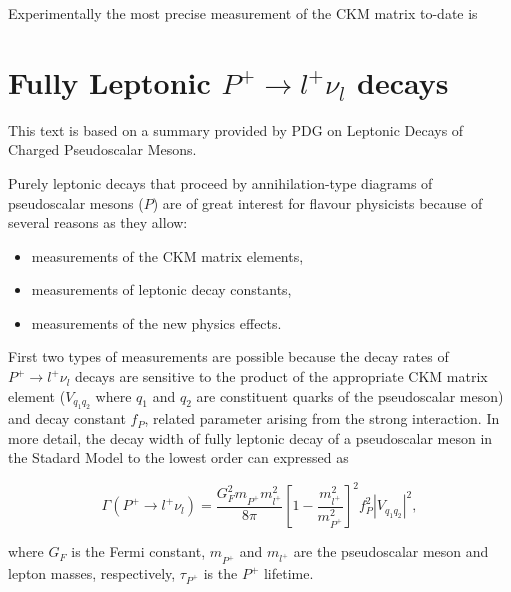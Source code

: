 Experimentally the most precise measurement of the CKM matrix\cite{ewconstraint} to-date is 

\section{Fully Leptonic $P^{+}\rightarrow l^{+} \nu_{l}$ decays}
This text is based on a summary provided by PDG on Leptonic Decays of Charged Pseudoscalar Mesons.


Purely leptonic decays that proceed by annihilation-type diagrams of pseudoscalar mesons ($P$) are of great interest for flavour physicists because of several reasons as they allow:
\begin{itemize}
\item measurements of the CKM matrix elements,
\item measurements of leptonic decay constants,
\item measurements of the new physics effects.
\end{itemize}



First two types of measurements are possible because the decay rates of $P^{+}\rightarrow l^{+} \nu_{l}$ decays are sensitive to the product of the appropriate CKM matrix element ($V_{q_{1}q_{2}}$ where $q_{1}$ and $q_{2}$ are constituent quarks of the pseudoscalar meson) and decay constant $f_{P}$, related parameter arising from the strong interaction. In more detail, the decay width of fully leptonic decay of a pseudoscalar meson in the Stadard Model to the lowest order can expressed as 

\begin{equation}
\Gamma(P^{+} \rightarrow {l^{+}} \nu_{l})=  
	\frac{G_{F}^{2} m^{}_{P^{+}}  m_{l^{+}}^{2}}{8\pi} 
	\left[1 - \frac{m_{l^{+}}^{2}}{m_{P^{+}}^{2}}\right]^{2}  
	f_{P}^{2} |V_{q_{1}q_{2}}|^{2} 
	,
\label{eqn:dw} 
\end{equation}

where
$G_F$ is the Fermi constant,
$m^{}_{P^{+}}$ and $m_{l^{+}}$ are the pseudoscalar meson and lepton masses, respectively,
$\tau_{P^{+}}$ is the $P^{+}$ lifetime.

